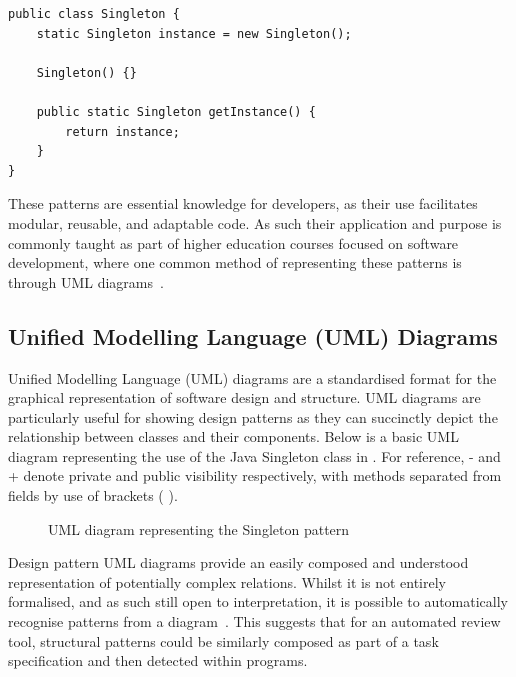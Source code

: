 \begin{listing}[H]
\begin{verbatim}
public class Singleton {
    static Singleton instance = new Singleton();

    Singleton() {}

    public static Singleton getInstance() {
        return instance;
    }
}
\end{verbatim}
\caption{A minimal Java implementation of the Singleton pattern}
\label{lst:singleton-pattern}
\end{listing}

These patterns are essential knowledge for developers, as their use facilitates modular, reusable, and adaptable code. As such their application and purpose is commonly taught as part of higher education courses focused on software development, where one common method of representing these patterns is through UML diagrams~\cite{GraphicalDepictionOfDP}.

\subsection{Unified Modelling Language (UML) Diagrams}
Unified Modelling Language (UML) diagrams are a standardised format for the graphical representation of software design and structure. UML diagrams are particularly useful for showing design patterns as they can succinctly depict the relationship between classes and their components. Below is a basic UML diagram representing the use of the Java Singleton class in . For reference, - and + denote private and public visibility respectively, with methods separated from fields by use of brackets ( ).

\begin{figure}[H]
    \centering
    
    \caption{UML diagram representing the Singleton pattern}
    \label{fig:uml}
\end{figure}

Design pattern UML diagrams provide an easily composed and understood representation of potentially complex relations. Whilst it is not entirely formalised, and as such still open to interpretation, it is possible to automatically recognise patterns from a diagram~\cite{UMLDesignPatterns}. This suggests that for an automated review tool, structural patterns could be similarly composed as part of a task specification and then detected within programs.


